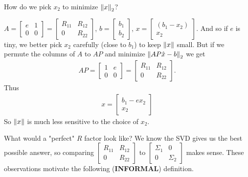 \documentclass[11pt]{article}
\numberwithin{equation}{section}
\begin{document}
How do we pick $x_2$ to minimize $\left\| x \right\|_2$?
\begin{example}
    $A=\left[\begin{array}{ll}
        e & 1 \\
        0 & 0
        \end{array}\right]=\left[\begin{array}{ll}
        R_{11} & R_{12} \\
        0 & R_{22}
        \end{array}\right]$, $b=\left[\begin{array}{l}
            b_{1} \\
            b_{2}
            \end{array}\right]$, $x=\left[\begin{array}{c}
                \left(b_{1}-x_{2}\right) \\
                x_{2}
                \end{array}\right]$.
    And so if $e$ is tiny, we better pick $x_2$ carefully (close to $b_1$) to keep $\left\| x \right\|$ small. But if we permute the columns of $A$ to $AP$ and minimize
    $\left\| AP \hat{x} - b \right\|_2$ we get \begin{align*}
        A P=\left[\begin{array}{ll}
            1 & e \\
            0 & 0
            \end{array}\right]=\left[\begin{array}{ll}
            R_{11} & R_{12} \\
            0 & R_{22}
            \end{array}\right].
    \end{align*}
    Thus \begin{align*}
        x=\left[\begin{array}{c}
            b_{1}-e x_{2} \\
            x_{2}
            \end{array}\right]
    \end{align*}
    So $\left\| x \right\|$ is much less sensitive to the choice of $x_{2}$. 
\end{example}

What would a "perfect" $R$ factor look like? We know the SVD gives us the best possible
answer, so comparing $\left[\begin{array}{ll}
    R_{11} & R_{12} \\
    0 & R_{22}
    \end{array}\right]$ to $\left[\begin{array}{cc}
        \Sigma_{1} & 0 \\
        0 & \Sigma_{2}
        \end{array}\right]$ makes sense. These observations motivate the following (\textbf{INFORMAL}) definition.
\end{document}
